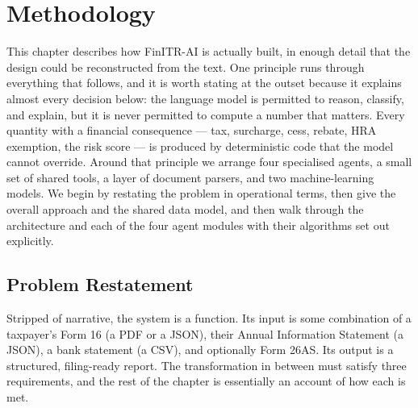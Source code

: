 
\chapter{Methodology}
\label{chap:methodology}

This chapter describes how FinITR-AI is actually built, in enough detail that
the design could be reconstructed from the text. One principle runs through
everything that follows, and it is worth stating at the outset because it
explains almost every decision below: the language model is permitted to reason,
classify, and explain, but it is never permitted to compute a number that
matters. Every quantity with a financial consequence --- tax, surcharge, cess,
rebate, HRA exemption, the risk score --- is produced by deterministic code that
the model cannot override. Around that principle we arrange four specialised
agents, a small set of shared tools, a layer of document parsers, and two
machine-learning models. We begin by restating the problem in operational terms,
then give the overall approach and the shared data model, and then walk through
the architecture and each of the four agent modules with their algorithms set
out explicitly.

\section{Problem Restatement}
\label{sec:problem-restatement}

Stripped of narrative, the system is a function. Its input is some combination
of a taxpayer's Form 16 (a PDF or a JSON), their Annual Information Statement (a
JSON), a bank statement (a CSV), and optionally Form 26AS. Its output is a
structured, filing-ready report. The transformation in between must satisfy
three requirements, and the rest of the chapter is essentially an account of how
each is met.

